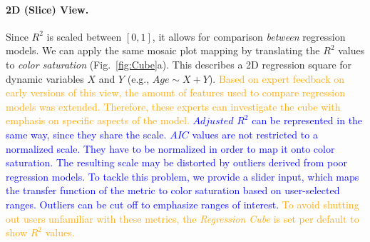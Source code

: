 \documentclass[journal]{style/vgtc} 			          %
\newcommand{\add}[1]{\textcolor{blue}{#1}}
\newcommand{\design}[1]{\textcolor{orange}{#1}}
\begin{document}
\paragraph{2D (Slice) View.}
Since $R^2$ is scaled between $[0, 1]$, it allows for comparison \emph{between} regression models.
We can apply the same mosaic plot mapping by translating the $R^2$ values to \emph{color saturation} (Fig.~\ref{fig:Cube}a).
This describes a 2D regression square for dynamic variables $X$ and $Y$ (e.g., $Age \sim X + Y$).
\design{
Based on expert feedback on early versions of this view, the amount of features used to compare regression models was extended.
Therefore, these experts can investigate the cube with emphasis on specific aspects of the model.
}
\add{
$Adjusted$ $R^2$ can be represented in the same way, since they share the scale.
$AIC$ values are not restricted to a normalized scale.
They have to be normalized in order to map it onto color saturation.
The resulting scale may be distorted by outliers derived from poor regression models.
To tackle this problem, we provide a slider input, which maps the transfer function of the metric to color saturation based on user-selected ranges.
Outliers can be cut off to emphasize ranges of interest.
}
\design{
To avoid shutting out users unfamiliar with these metrics, the \emph{Regression Cube} is set per default to show $R^2$ values.
}
\end{document}
